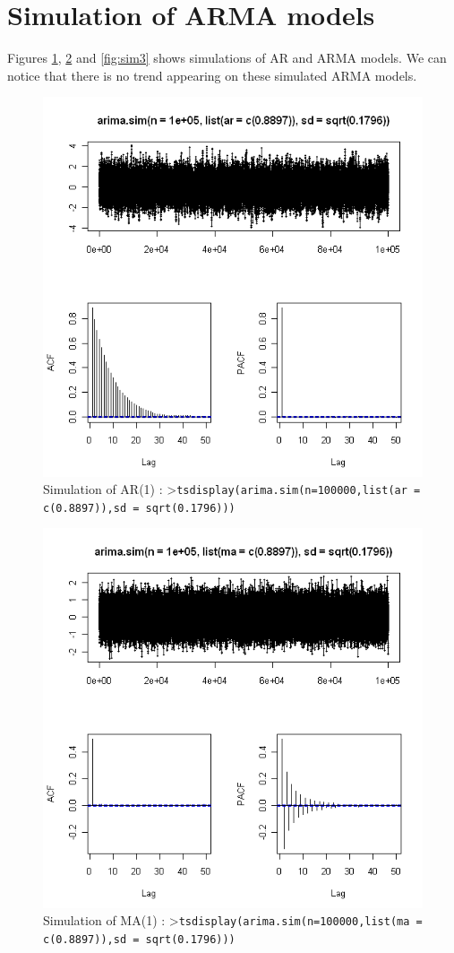 \documentclass[a4paper,11pt,oneside,onecolumn]{book}
\begin{document}
\section{Simulation of ARMA models}

Figures \ref{fig:sim1}, \ref{fig:sim2} and \ref{fig:sim3} shows simulations of AR and ARMA models.
We can notice that there is no trend appearing on these simulated ARMA models. 

\begin{figure}[!h]
\begin{center}
\includegraphics[width=.8\linewidth]{ SimAR1.png}
\caption{Simulation of AR(1) : >\texttt{tsdisplay(arima.sim(n=100000,list(ar = c(0.8897)),sd = sqrt(0.1796)))}}
\label{fig:sim1}
\end{center}
\end{figure}

\begin{figure}[!h]
\begin{center}
\includegraphics[width=.8\linewidth]{ SimMA1.png}
\caption{Simulation of MA(1) : >\texttt{tsdisplay(arima.sim(n=100000,list(ma = c(0.8897)),sd = sqrt(0.1796)))}}
\label{fig:sim2}
\end{center}
\end{figure}
\end{document}
